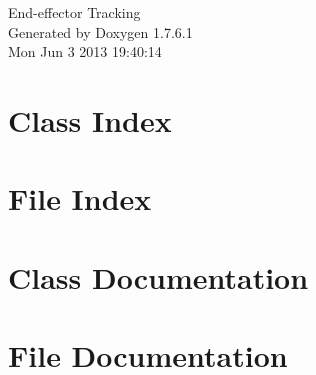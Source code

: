 \documentclass[a4paper]{book}
\begin{document}
\hypersetup{pageanchor=false,citecolor=blue}
\begin{titlepage}
\vspace*{7cm}
\begin{center}
{\Large \-End-\/effector \-Tracking }\\
\vspace*{1cm}
{\large \-Generated by Doxygen 1.7.6.1}\\
\vspace*{0.5cm}
{\small Mon Jun 3 2013 19:40:14}\\
\end{center}
\end{titlepage}
\clearemptydoublepage
{}
\tableofcontents
\clearemptydoublepage
{}
\hypersetup{pageanchor=true,citecolor=blue}
\chapter{\-Class \-Index}

\chapter{\-File \-Index}

\chapter{\-Class \-Documentation}










\chapter{\-File \-Documentation}













\printindex
\end{document}
